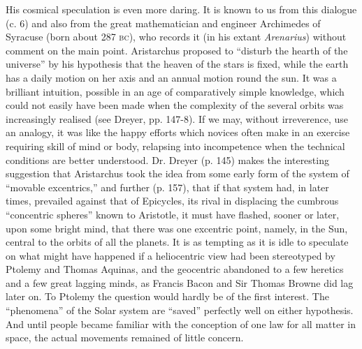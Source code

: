 \documentclass[a4paper, 11pt, oneside, polutonikogreek, english]{article}
\begin{document}
His cosmical speculation is even more daring. It is known to us from this dialogue (c. 6) and also from the great mathematician and engineer Archimedes of Syracuse (born about 287 \textsc{bc}), who records it (in his extant \emph{Arenarius}) without comment on the main point. Aristarchus proposed to ``disturb the hearth of the universe'' by his hypothesis that the heaven of the stars is fixed, while the earth has a daily motion on her axis and an annual motion round the sun. It was a brilliant intuition, possible in an age of comparatively simple knowledge, which could not easily have been made when the complexity of the several orbits was increasingly realised (see Dreyer, pp. 147-8). If we may, without irreverence, use an analogy, it was like the happy efforts which novices often make in an exercise requiring skill of mind or body, relapsing into incompetence when the technical conditions are better understood. Dr. Dreyer (p. 145) makes the interesting suggestion that Aristarchus took the idea from some early form of the system of ``movable excentrics,'' and further (p. 157), that if that system had, in later times, prevailed against that of Epicycles, its rival in displacing the cumbrous ``concentric spheres'' known to Aristotle, it must have flashed, sooner or later, upon some bright mind, that there was one excentric point, namely, in the Sun, central to the orbits of all the planets. It is as tempting as it is idle to speculate on what might have happened if a heliocentric view had been stereotyped by Ptolemy and Thomas Aquinas, and the geocentric abandoned to a few heretics and a few great lagging minds, as Francis Bacon and Sir Thomas Browne did lag later on. To Ptolemy the question would hardly be of the first interest. The ``phenomena'' of the Solar system are ``saved'' perfectly well on either hypothesis. And until people became familiar with the conception of one law for all matter in space, the actual movements remained of little concern.
\end{document}
